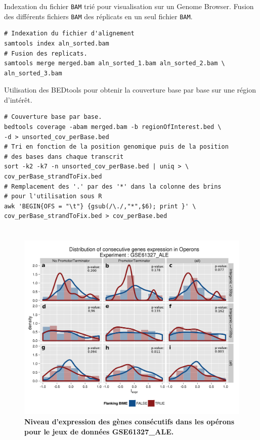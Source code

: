 \documentclass[12pt,a4paper]{report}
\begin{document}
Indexation du fichier \texttt{BAM} trié pour visualisation sur un Genome Browser. Fusion des différents fichiers \texttt{BAM} des réplicats en un seul fichier \texttt{BAM}.
\begin{lstlisting}[frame=single]
# Indexation du fichier d'alignement
samtools index aln_sorted.bam
# Fusion des replicats.
samtools merge merged.bam aln_sorted_1.bam aln_sorted_2.bam \
aln_sorted_3.bam
\end{lstlisting}

Utilisation des BEDtools pour obtenir la couverture base par base sur une région d'intérêt.
\lstset{language=sh, commentstyle=\color{ForestGreen}}  
\begin{lstlisting}[frame=single]
# Couverture base par base.
bedtools coverage -abam merged.bam -b regionOfInterest.bed \
-d > unsorted_cov_perBase.bed
# Tri en fonction de la position genomique puis de la position 
# des bases dans chaque transcrit
sort -k2 -k7 -n unsorted_cov_perBase.bed | uniq > \
cov_perBase_strandToFix.bed
# Remplacement des '.' par des '*' dans la colonne des brins 
# pour l'utilisation sous R
awk 'BEGIN{OFS = "\t"} {gsub(/\./,"*",$6); print }' \
cov_perBase_strandToFix.bed > cov_perBase.bed
\end{lstlisting}

\chapter{}
\label{annexeOperon}
\begin{figure}[!h]
\centerline{\includegraphics[scale=0.7]{figures/supData/genesOperon_histoDens_GSE61327_ALE.png}}
\caption{\textbf{Niveau d'expression des gènes consécutifs dans les opérons pour le jeux de données GSE61327\_ALE.}}
\end{figure}
\end{document}
